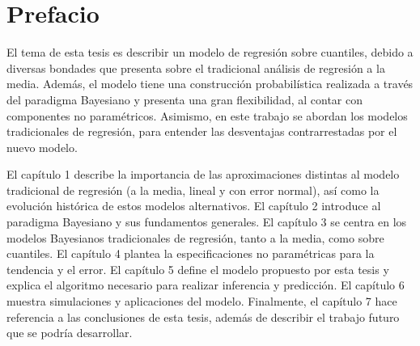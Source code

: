 \pagestyle{plain}
\chapter*{Prefacio}


El tema de esta tesis es describir un modelo de regresi\'on sobre cuantiles, debido a diversas bondades que presenta sobre el tradicional an\'alisis de regresi\'on a la media. Adem\'as, el modelo tiene una construcci\'on probabil\'istica realizada a través del paradigma Bayesiano y presenta una gran flexibilidad, al contar con componentes no param\'etricos. Asimismo, en este trabajo se abordan los modelos tradicionales de regresi\'on, para entender las desventajas contrarrestadas por el nuevo modelo.

El cap\'itulo 1 describe la importancia de las aproximaciones distintas al modelo tradicional de regresi\'on (a la media, lineal y con error normal), así como la evoluci\'on hist\'orica de estos modelos alternativos. El cap\'itulo 2 introduce al paradigma Bayesiano y sus fundamentos generales. El cap\'itulo 3 se centra en los modelos Bayesianos tradicionales de regresi\'on, tanto a la media, como sobre cuantiles. El cap\'itulo 4 plantea la especificaciones no param\'etricas para la tendencia y el error. El cap\'itulo 5 define el modelo propuesto por esta tesis y explica el algoritmo necesario para realizar inferencia y predicci\'on. El cap\'itulo 6 muestra simulaciones y aplicaciones del modelo. Finalmente, el cap\'itulo 7 hace referencia a las conclusiones de esta tesis, adem\'as de describir el trabajo futuro que se podr\'ia desarrollar.